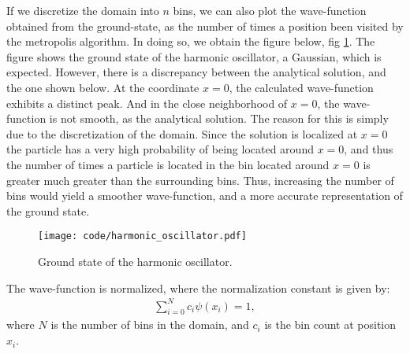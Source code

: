 \documentclass[a4paper]{article}
\newcommand{\newparagraph}{\vspace{.5cm}\noindent}
\begin{document}
\newparagraph
If we discretize the domain into $n$ bins, we can also plot the wave-function obtained from the ground-state, as the number of times a position been visited by the metropolis algorithm.
In doing so, we obtain the figure below, fig \ref*{fig: harmonic_oscillator}.
The figure shows the ground state of the harmonic oscillator, a Gaussian, which is expected.
However, there is a discrepancy between the analytical solution, and the one shown below. At the coordinate $x = 0$, the calculated wave-function exhibits a distinct peak.
And in the close neighborhood of $x = 0$, the wave-function is not smooth, as the analytical solution.
The reason for this is simply due to the discretization of the domain.
Since the solution is localized at $x = 0$ the particle has a very high probability of being located around $x = 0$, and thus the number of times a particle is located in the bin located around $x = 0$ is greater much greater than the surrounding bins.
Thus, increasing the number of bins would yield a smoother wave-function, and a more accurate representation of the ground state. 

\begin{figure}
    \centering
    \texttt{[image: code/harmonic\_oscillator.pdf]}
    \caption{Ground state of the harmonic oscillator.}
    \label{fig: harmonic_oscillator}
\end{figure}\noindent
The wave-function is normalized, where the normalization constant is given by:
\begin{align*}
    \sum_{i = 0}^{N} c_i\psi(x_i) = 1,
\end{align*}where $N$ is the number of bins in the domain, and $c_i$ is the bin count at position $x_i$.

\newpage
\end{document}

